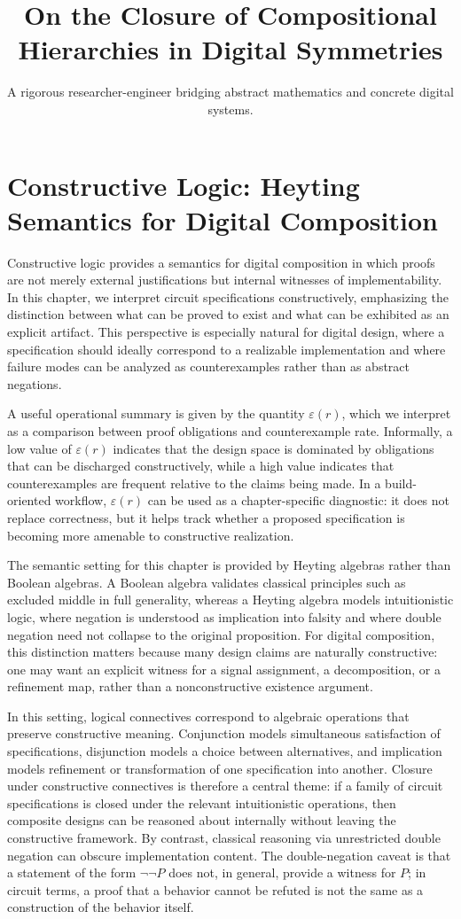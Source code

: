 \documentclass[11pt]{article}
\title{On the Closure of Compositional Hierarchies in Digital Symmetries}
\author{A rigorous researcher-engineer bridging abstract mathematics and concrete digital systems.}
\begin{document}
\section*{Constructive Logic: Heyting Semantics for Digital Composition}

Constructive logic provides a semantics for digital composition in which proofs are not merely external justifications but internal witnesses of implementability. In this chapter, we interpret circuit specifications constructively, emphasizing the distinction between what can be proved to exist and what can be exhibited as an explicit artifact. This perspective is especially natural for digital design, where a specification should ideally correspond to a realizable implementation and where failure modes can be analyzed as counterexamples rather than as abstract negations.

A useful operational summary is given by the quantity \(\varepsilon(r)\), which we interpret as a comparison between proof obligations and counterexample rate. Informally, a low value of \(\varepsilon(r)\) indicates that the design space is dominated by obligations that can be discharged constructively, while a high value indicates that counterexamples are frequent relative to the claims being made. In a build-oriented workflow, \(\varepsilon(r)\) can be used as a chapter-specific diagnostic: it does not replace correctness, but it helps track whether a proposed specification is becoming more amenable to constructive realization.

The semantic setting for this chapter is provided by Heyting algebras rather than Boolean algebras. A Boolean algebra validates classical principles such as excluded middle in full generality, whereas a Heyting algebra models intuitionistic logic, where negation is understood as implication into falsity and where double negation need not collapse to the original proposition. For digital composition, this distinction matters because many design claims are naturally constructive: one may want an explicit witness for a signal assignment, a decomposition, or a refinement map, rather than a nonconstructive existence argument.

In this setting, logical connectives correspond to algebraic operations that preserve constructive meaning. Conjunction models simultaneous satisfaction of specifications, disjunction models a choice between alternatives, and implication models refinement or transformation of one specification into another. Closure under constructive connectives is therefore a central theme: if a family of circuit specifications is closed under the relevant intuitionistic operations, then composite designs can be reasoned about internally without leaving the constructive framework. By contrast, classical reasoning via unrestricted double negation can obscure implementation content. The double-negation caveat is that a statement of the form \(\neg\neg P\) does not, in general, provide a witness for \(P\); in circuit terms, a proof that a behavior cannot be refuted is not the same as a construction of the behavior itself.
\end{document}
